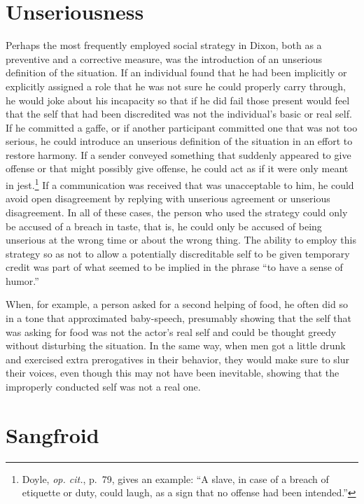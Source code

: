 \documentclass[twoside,symmetric,nobib,justified]{tufte-book}
\begin{document}
\hypertarget{unseriousness}{%
\section{Unseriousness}\label{unseriousness}}

Perhaps the most frequently employed social strategy in Dixon, both as a
preventive and a corrective measure, was the introduction of an
unserious definition of the situation. If an individual found that he
had been implicitly or explicitly assigned a role that he was not sure
he could properly carry through, he would joke about his incapacity so
that if he did fail those present would feel that the self that had been
discredited was not the individual's basic or real self. If he committed
a gaffe, or if another participant committed one that was not too
serious, he could introduce an unserious definition of the situation in
an effort to restore harmony. If a sender conveyed something that
suddenly appeared to give offense or that might possibly give offense,
he could act as if it were only meant in jest.\footnote{Doyle, \emph{op.
  cit.}, p.~79, gives an example: ``A slave, in case of a breach of
  etiquette or duty, could laugh, as a sign that no offense had been
  intended.''} If a communication was received that was unacceptable to
him, he could avoid open disagreement by replying with unserious
agreement or unserious disagreement. In all of these cases, the person
who used the strategy could only be accused of a breach in taste, that
is, he could only be accused of being unserious at the wrong time or
about the wrong thing. The ability to employ this strategy so as not to
allow a potentially discreditable self to be given temporary credit was
part of what seemed to be implied in the phrase ``to have a sense of
humor.''

When, for example, a person asked for a second helping of food, he often
did so in a tone that approximated baby-speech, presumably showing that
the self that was asking for food was not the actor's real self and
could be thought greedy without disturbing the situation. In the same
way, when men got a little drunk and exercised extra prerogatives in
their behavior, they would make sure to slur their voices, even though
this may not have been inevitable, showing that the improperly conducted
self was not a real one.

\hypertarget{sangfroid}{%
\section{Sangfroid}\label{sangfroid}}
\end{document}
